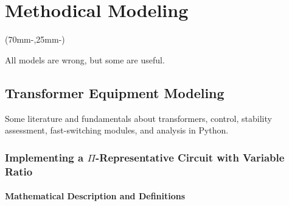 
\chapter{Methodical Modeling}
\label{chap:methodical-modeling}

\begin{textblock*}{.7\textwidth}(70mm-\offset,25mm-\offset)
        \begin{fquote}
            All models are wrong, but some are useful.
        \end{fquote}
\end{textblock*}

\section{Transformer Equipment Modeling}

Some literature and fundamentals about transformers, control, stability assessment, fast-switching modules, and analysis in Python. 


\subsection{Implementing a $\Pi$-Representative Circuit with Variable Ratio}

\subsubsection{Mathematical Description and Definitions}

